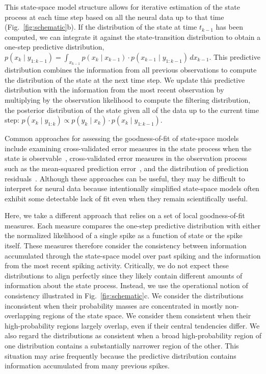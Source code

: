 \documentclass[12pt]{article}
\begin{document}
This state-space model structure allows for iterative estimation of the state process at each time step based on all the neural data up to that time (Fig.~\ref{fig:schematic}b). If the distribution of the state at time $t_{k-1}$ has been computed, we can integrate it against the state-transition distribution to obtain a one-step predictive distribution, $p(x_{k} \mid y_{1:k-1}) = \int_{x_{k-1}} p(x_k \mid x_{k-1}) \cdot p(x_{k-1} \mid y_{1:k-1})\, dx_{k-1}$. This predictive distribution combines the information from all previous observations to compute the distribution of the state at the next time step. We update this predictive distribution with the information from the most recent observation by multiplying by the observation likelihood to compute the filtering distribution, the posterior distribution of the state given all of the data up to the current time step: $p(x_{k} \mid y_{1:k}) \propto p(y_{k} \mid x_{k}) \cdot p(x_{k} \mid y_{1:k-1})$.

Common approaches for assessing the goodness-of-fit of state-space models include examining cross-validated error measures in the state process when the state is observable~\cite{stoneCrossValidatoryChoiceAssessment1974}, cross-validated error measures in the observation process such as the mean-squared prediction error~\cite{Hastieelementsstatisticallearning2009}, and the distribution of prediction residuals~\cite{shenResidualAnalysisBasedModel2024}. Although these approaches can be useful, they may be difficult to interpret for neural data because intentionally simplified state-space models often exhibit some detectable lack of fit even when they remain scientifically useful.

Here, we take a different approach that relies on a set of local goodness-of-fit measures. Each measure compares the one-step predictive distribution with either the normalized likelihood of a single spike as a function of state or the spike itself. These measures therefore consider the consistency between information accumulated through the state-space model over past spiking and the information from the most recent spiking activity. Critically, we do not expect these distributions to align perfectly since they likely contain different amounts of information about the state process. Instead, we use the operational notion of consistency illustrated in Fig.~\ref{fig:schematic}c. We consider the distributions inconsistent when their probability masses are concentrated in mostly non-overlapping regions of the state space. We consider them consistent when their high-probability regions largely overlap, even if their central tendencies differ. We also regard the distributions as consistent when a broad high-probability region of one distribution contains a substantially narrower region of the other. This situation may arise frequently because the predictive distribution contains information accumulated from many previous spikes.
\end{document}
